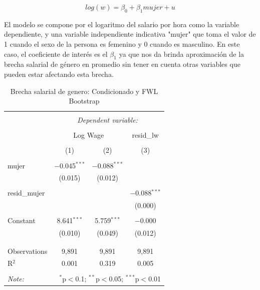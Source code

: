 \documentclass[10pt]{article}
\begin{document}
\begin{equation}
\label{eq:ols}
    log(w)= \beta_0 + \beta_1 mujer+u
\end{equation}

El modelo se compone por el logaritmo del salario por hora como la variable dependiente, y una variable independiente indicativa "mujer" que toma el valor de 1 cuando el sexo de la persona es femenino y 0 cuando es masculino. En este caso, el coeficiente de interés es el $\beta_1$ ya que nos da brinda aproximación de la brecha salarial de género en promedio sin tener en cuenta otras variables que pueden estar afectando esta brecha. 

\begin{table}[!htbp] \centering 
  \caption{Brecha salarial de genero: Condicionado y FWL Bootstrap} 
  \label{} 
\begin{tabular}{@{\extracolsep{5pt}}lccc} 
\\[-1.8ex]\hline 
\hline \\[-1.8ex] 
 & \multicolumn{3}{c}{\textit{Dependent variable:}} \\ 
\cline{2-4} 
\\[-1.8ex] & \multicolumn{2}{c}{Log Wage} & resid\_lw \\ 
\\[-1.8ex] & (1) & (2) & (3)\\ 
\hline \\[-1.8ex] 
 mujer & $-$0.045$^{***}$ & $-$0.088$^{***}$ &  \\ 
  & (0.015) & (0.012) &  \\ 
  & & & \\ 
 resid\_mujer &  &  & $-$0.088$^{***}$ \\ 
  &  &  & (0.000) \\ 
  & & & \\ 
 Constant & 8.641$^{***}$ & 5.759$^{***}$ & $-$0.000 \\ 
  & (0.010) & (0.049) & (0.012) \\ 
  & & & \\ 
\hline \\[-1.8ex] 
Observations & 9,891 & 9,891 & 9,891 \\ 
R$^{2}$ & 0.001 & 0.319 & 0.005 \\ 
\hline 
\hline \\[-1.8ex] 
\textit{Note:}  & \multicolumn{3}{r}{$^{*}$p$<$0.1; $^{**}$p$<$0.05; $^{***}$p$<$0.01} \\ 
\end{tabular} 
\end{table} 
\end{document}
